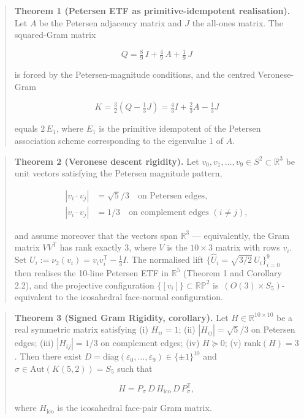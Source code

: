 \documentclass[
]{article}
\begin{document}
\begin{quote}
\textbf{Theorem 1 (Petersen ETF as primitive-idempotent realisation).}
Let \(A\) be the Petersen adjacency matrix and \(J\) the all-ones
matrix. The squared-Gram matrix

\[
Q = \tfrac{8}{9}\,I + \tfrac{4}{9}\,A + \tfrac{1}{9}\,J
\]

is forced by the Petersen-magnitude conditions, and the centred
Veronese-Gram

\[
K = \tfrac{3}{2}\left(Q - \tfrac{1}{3}J\right) = \tfrac{4}{3}I + \tfrac{2}{3}A - \tfrac{1}{3}J
\]

equals \(2\,E_1\), where \(E_1\) is the primitive idempotent of the
Petersen association scheme corresponding to the eigenvalue \(1\) of
\(A\).
\end{quote}

\begin{quote}
\textbf{Theorem 2 (Veronese descent rigidity).} Let
\(v_0, v_1, \ldots, v_9 \in S^2 \subset \mathbb{R}^3\) be unit vectors
satisfying the Petersen magnitude pattern,

\[
\begin{aligned}
|v_i \cdot v_j| &= \sqrt{5}/3 \quad \text{on Petersen edges},\\
|v_i \cdot v_j| &= 1/3 \quad \text{on complement edges } (i \neq j),
\end{aligned}
\]

and assume moreover that the vectors span \(\mathbb{R}^3\) ---
equivalently, the Gram matrix \(V V^{\mathsf T}\) has rank exactly
\(3\), where \(V\) is the \(10\times 3\) matrix with rows \(v_i\). Set
\(U_i := \nu_2(v_i) = v_i v_i^{\mathsf T} - \tfrac{1}{3}I\). The
normalised lift \(\{\hat U_i = \sqrt{3/2}\,U_i\}_{i=0}^9\) then realises
the 10-line Petersen ETF in \(\mathbb{R}^5\) (Theorem 1 and Corollary
2.2), and the projective configuration
\(\{[v_i]\} \subset \mathbb{RP}^2\) is
\(\,(O(3) \times S_5)\)-equivalent to the icosahedral face-normal
configuration.
\end{quote}

\begin{quote}
\textbf{Theorem 3 (Signed Gram Rigidity, corollary).} Let \(H \in
\mathbb{R}^{10\times 10}\) be a real symmetric matrix satisfying (i)
\(H_{ii} = 1\); (ii) \(|H_{ij}| = \sqrt{5}/3\) on Petersen edges; (iii)
\(|H_{ij}| = 1/3\) on complement edges; (iv) \(H \succeq 0\); (v)
\(\mathrm{rank}(H) = 3\). Then there exist
\(D = \mathrm{diag}(\varepsilon_0,\dots,\varepsilon_9) \in \{\pm 1\}^{10}\)
and \(\sigma \in \mathrm{Aut}(K(5,2)) = S_5\) such that

\[
H = P_\sigma\,D\,H_{\mathrm{ico}}\,D\,P_\sigma^{\mathsf T},
\]

where \(H_{\mathrm{ico}}\) is the icosahedral face-pair Gram matrix.
\end{quote}
\end{document}
